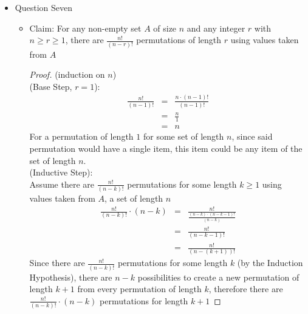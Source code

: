 \documentclass{article}
\begin{document}
\begin{itemize}
\begin{itemize}
\begin{proof}
\begin{align}
                &\hspace{1cm} \text{Let } m = 2a^2 \\
                &\hspace{1cm} \text{Since } m = 2a^2 \text{, we know } \frac{m}{2} = a^2 \\
                &\hspace{1cm} \text{Since } \frac{m}{2} = a^2 \text{, we know } \sqrt{\frac{m}{2}} = a \\
                &\hspace{1cm} \text{Since } \sqrt{\frac{m}{2}} = a \text{, we know } \left (\sqrt{\frac{m}{2}}\right )^n = a^n \\
                &\hspace{1cm} \text{Since } n! > \left (\sqrt{\frac{m}{2}}\right )^n \text{ and } \left (\sqrt{\frac{m}{2}}\right )^n = a^n \text{, we know } n! > a^n
            \end{align}
        \end{proof}
    \end{itemize}
    \item Question Seven
    \begin{itemize}
        \item Claim: For any non-empty set $A$ of size $n$ and any integer $r$ with $n \geq r \geq 1$, there are $\frac{n!}{(n-r)!}$ permutations of length $r$ using values taken from $A$
        \begin{proof}
            (induction on $n$) \\
            (Base Step, $r=1$):
            \begin{eqnarray}
                \frac{n!}{(n-1)!} &=& \frac{n \cdot (n-1)!}{(n-1)!} \\
                &=& \frac{n}{1} \\
                &=& n
            \end{eqnarray}
            For a permutation of length $1$ for some set of length $n$, since said permutation would have a single item, this item could be any item of the set of length $n$. \\
            (Inductive Step): \\
            Assume there are $\frac{n!}{(n-k)!}$ permutations for some length $k \geq 1$ using values taken from $A$, a set of length $n$
            \begin{eqnarray}
                \frac{n!}{(n-k)!} \cdot (n-k) &=& \frac{n!}{\frac{(n-k) \cdot (n-k-1)!}{(n-k)}} \\
                &=& \frac{n!}{(n-k-1)!} \\
                &=& \frac{n!}{(n-(k+1))!}
            \end{eqnarray}
            Since there are $\frac{n!}{(n-k)!}$ permutations for some length $k$ (by the Induction Hypothesis), there are $n-k$ possibilities to create a new permutation of length $k+1$ from every permutation of length $k$, therefore there are $\frac{n!}{(n-k)!} \cdot (n-k)$ permutations for length $k+1$
        \end{proof}
    \end{itemize}
\end{itemize}
\end{document}
